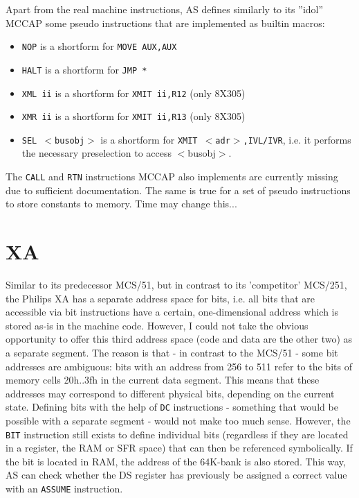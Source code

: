 \documentclass[12pt,twoside]{report}
\newcommand{\tty}[1]{{\tt #1}}
\begin{document}
Apart from the real machine instructions, AS defines similarly to its
''idol'' MCCAP some pseudo instructions that are implemented as builtin
macros:
\begin{itemize}
\item{\tty{NOP} is a shortform for \tty{MOVE AUX,AUX}}
\item{\tty{HALT} is a shortform for {\tt JMP \verb!*!}}
\item{\tty{XML ii} is a shortform for \tty{XMIT ii,R12} (only 8X305)}
\item{\tty{XMR ii} is a shortform for \tty{XMIT ii,R13} (only 8X305)}
\item{\tty{SEL $<$busobj$>$} is a shortform for \tty{XMIT $<$adr$>$,IVL/IVR},
   i.e. it performs the necessary preselection to access $<$busobj$>$.}
\end{itemize}
The \tty{CALL} and \tty{RTN} instructions MCCAP also implements are
currently missing due to sufficient documentation.  The same is true for a
set of pseudo instructions to store constants to memory.  Time may change
this...


\section{XA}

Similar to its predecessor MCS/51, but in contrast to its
'competitor' MCS/251, the Philips XA has a separate address space for
bits, i.e. all bits that are accessible via bit instructions have a
certain, one-dimensional address which is stored as-is in the machine
code.  However, I could not take the obvious opportunity to offer
this third address space (code and data are the other two) as a
separate segment.  The reason is that - in contrast to the MCS/51 -
some bit addresses are ambiguous: bits with an address from 256 to 511
refer to the bits of memory cells 20h..3fh in the current data
segment.  This means that these addresses may correspond to different
physical bits, depending on the current state.  Defining bits with
the help of \tty{DC} instructions - something that would be possible with a
separate segment - would not make too much sense.  However, the \tty{BIT}
instruction still exists to define individual bits (regardless if
they are located in a register, the RAM or SFR space) that can then
be referenced symbolically.  If the bit is located in RAM, the
address of the 64K-bank is also stored.  This way, AS can check
whether the DS register has previously be assigned a correct value
with an \tty{ASSUME} instruction.
\end{document}
